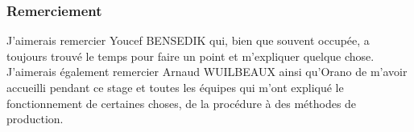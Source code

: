 

\begin{center}

    \subsubsection*{Remerciement}
J'aimerais remercier Youcef BENSEDIK qui, bien que souvent occupée, a toujours trouvé le temps pour faire un point et m'expliquer quelque chose. J'aimerais également remercier Arnaud WUILBEAUX ainsi qu’Orano  de m'avoir accueilli pendant ce stage et toutes les équipes qui m'ont expliqué le fonctionnement de certaines choses,  de la procédure à des méthodes de production.
\end{center}


\begin{abstract}
    \lipsum[1]
\end{abstract}
    

\begin{adjustwidth}{30pt}{30pt}
\end{adjustwidth}

\tableofcontents
\listoffigures
\clearpage
